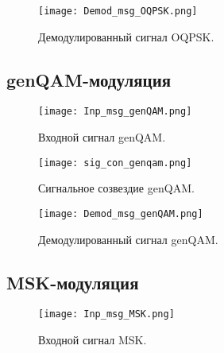 \begin{figure}[H]
	\begin{center}
		\texttt{[image: Demod\_msg\_OQPSK.png]}
		\caption{Демодулированный сигнал OQPSK.} %
		\label{Demod_msg_OQPSK} %
	\end{center}
\end{figure}

\subsection{genQAM-модуляция}

\begin{figure}[H]
	\begin{center}
		\texttt{[image: Inp\_msg\_genQAM.png]}
		\caption{Входной сигнал genQAM.} %
		\label{Inp_msg_genQAM} %
	\end{center}
\end{figure}

\begin{figure}[H]
	\begin{center}
		\texttt{[image: sig\_con\_genqam.png]}
		\caption{Сигнальное созвездие genQAM.}
		\label{sig_con_genqam}
	\end{center}
\end{figure}

\begin{figure}[H]
	\begin{center}
		\texttt{[image: Demod\_msg\_genQAM.png]}
		\caption{Демодулированный сигнал genQAM.} %
		\label{Demod_msg_genQAM} %
	\end{center}
\end{figure}

\subsection{MSK-модуляция}

\begin{figure}[H]
	\begin{center}
		\texttt{[image: Inp\_msg\_MSK.png]}
		\caption{Входной сигнал MSK.} %
		\label{Inp_msg_MSK} %
	\end{center}
\end{figure}

